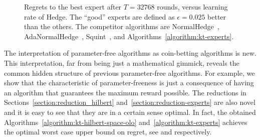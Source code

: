 \begin{figure}[t]
\centering
{}
\caption{\footnotesize{Regrets to the best expert after $T = 32768$ rounds, versus learning rate of Hedge. The ``good'' experts are defined as $\epsilon=0.025$ better than the others. The competitor algorithms are NormalHedge~\cite{Chaudhuri-Freund-Hsu-2009}, AdaNormalHedge~\cite{Luo-Schapire-2015}, Squint~\cite{Koolen-van-Erven-2015}, and Algorithms~\ref{algorithm:kt-experts}.}}
\label{fig:exp_lea}
\end{figure}

The interpretation of parameter-free algorithms as coin-betting algorithms is
new. This interpretation, far from being just a mathematical gimmick, reveals
the common hidden structure of previous parameter-free algorithms. For example,
we show that the characteristic of parameter-freeness is just a consequence of
having an algorithm that guarantees the maximum reward possible.
The reductions in Sections~\ref{section:reduction_hilbert} and~\ref{section:reduction-experts} are also novel and it is easy to see that they are in a
certain sense optimal. In fact, the obtained
Algorithms~\ref{algorithm:kt-hilbert-space-olo} and~\ref{algorithm:kt-experts}
achieves the optimal worst case upper bound on regret, see \cite{Streeter-McMahan-2012,Orabona-2013}
and \cite{Cesa-Bianchi-Lugosi-2006} respectively.

